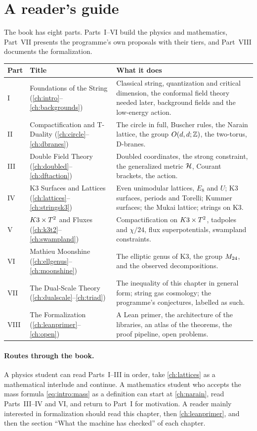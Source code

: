 \section{A reader's guide}\label{sec:intro:guide}

The book has eight parts. Parts~I--VI build the physics and mathematics, Part~VII presents
the programme's own proposals with their tiers, and Part~VIII documents the formalization.
{\small
\begin{longtable}{@{}lp{}p{}@{}}
\toprule
Part & Title & What it does\\
\midrule
I & Foundations of the String (\cref{ch:intro}--\cref{ch:backgrounds}) & Classical string,
quantization and critical dimension, the conformal field theory needed later, background
fields and the low-energy action.\\
II & Compactification and T-Duality (\cref{ch:circle}--\cref{ch:dbranes}) & The circle in
full, Buscher rules, the Narain lattice, the group $O(d,d;\mathbb{Z})$, the two-torus, D-branes.\\
III & Double Field Theory (\cref{ch:doubled}--\cref{ch:dftaction}) & Doubled coordinates, the
strong constraint, the generalized metric $\mathcal{H}$, Courant brackets, the action.\\
IV & K3 Surfaces and Lattices (\cref{ch:lattices}--\cref{ch:stringsk3}) & Even unimodular
lattices, $E_8$ and $U$; K3 surfaces, periods and Torelli; Kummer surfaces; the Mukai
lattice; strings on K3.\\
V & $K3\times T^2$ and Fluxes (\cref{ch:k3t2}--\cref{ch:swampland}) & Compactification on $K3\times T^2$,
tadpoles and $\chi/24$, flux superpotentials, swampland constraints.\\
VI & Mathieu Moonshine (\cref{ch:ellgenus}--\cref{ch:moonshine}) & The elliptic genus of K3,
the group $M_{24}$, and the observed decompositions.\\
VII & The Dual-Scale Theory (\cref{ch:dualscale}--\cref{ch:triad}) & The inequality of this
chapter in general form; string gas cosmology; the programme's conjectures, labelled as
such.\\
VIII & The Formalization (\cref{ch:leanprimer}--\cref{ch:open}) & A Lean primer, the
architecture of the libraries, an atlas of the theorems, the proof pipeline, open problems.\\
\bottomrule
\end{longtable}}

\paragraph{Routes through the book.} A physics student can read Parts~I--III in order, take
\cref{ch:lattices} as a mathematical interlude and continue. A mathematics student who
accepts the mass formula \eqref{eq:intro:mass} as a definition can start at \cref{ch:narain},
read Parts~III--IV and VI, and return to Part~I for motivation. A reader mainly interested in
formalization should read this chapter, then \cref{ch:leanprimer}, and then the section
``What the machine has checked'' of each chapter.

